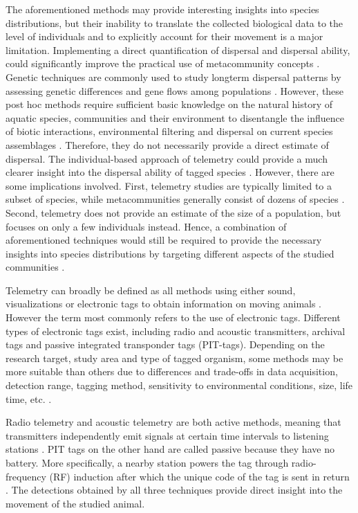 \documentclass[12pt,authoryear]{elsarticle}
\begin{document}
\vspace{5mm}

The aforementioned methods may provide interesting insights into species distributions, but their inability to translate the collected biological data to the level of individuals and to explicitly account for their movement is a major limitation. Implementing a direct quantification of dispersal and dispersal ability, could significantly improve the practical use of metacommunity concepts \citep{Heino2015,Jacobson2010}. Genetic techniques are commonly used to study longterm dispersal patterns by assessing genetic differences and gene flows among populations \citep{Hughes2007}. However, these post hoc methods require sufficient basic knowledge on the natural history of aquatic species, communities and their environment to disentangle the influence of biotic interactions, environmental filtering and dispersal on current species assemblages \citep{Jacobson2010}. Therefore, they do not necessarily provide a direct estimate of dispersal. The individual-based approach of telemetry could provide a much clearer insight into the dispersal ability of tagged species \citep{Thorstad2013}. However, there are some implications involved. First, telemetry studies are typically limited to a subset of species, while metacommunities generally consist of dozens of species \citep{Heino2015}. Second, telemetry does not provide an estimate of the size of a population, but focuses on only a few individuals instead. Hence, a combination of aforementioned techniques would still be required to provide the necessary insights into species distributions by targeting different aspects of the studied communities \citep{Emmrich2010}. 

\vspace{5mm}

Telemetry can broadly be defined as all methods using either sound, visualizations or electronic tags to obtain information on moving animals \citep{Thorstad2013}. However the term most commonly refers to the use of electronic tags. Different types of electronic tags exist, including radio and acoustic transmitters, archival tags and passive integrated transponder tags (PIT-tags). Depending on the research target, study area and type of tagged organism, some methods may be more suitable than others due to differences and trade-offs in data acquisition, detection range, tagging method, sensitivity to environmental conditions, size, life time, etc. \citep{Thorstad2013}.

Radio telemetry and acoustic telemetry are both active methods, meaning that transmitters independently emit signals at certain time intervals to listening stations \citep{Hussey2015,Donaldson2014}. PIT tags on the other hand are called passive because they have no battery. More specifically, a nearby station powers the tag through radio-frequency (RF) induction after which the unique code of the tag is sent in return \citep{Thorstad2013}. The detections obtained by all three techniques provide direct insight into the movement of the studied animal. 
\end{document}

